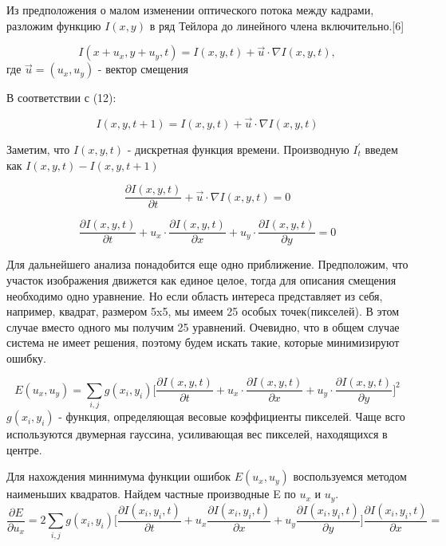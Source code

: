 \documentclass[a4paper,14pt]{extarticle}
\begin{document}
Из предположения о малом изменении оптического потока между кадрами, разложим функцию $I(x,y)$ в ряд Тейлора до линейного члена включительно.[6]

\begin{equation}
    I(x+u_x,y+u_y,t) = I(x,y,t) + \vec u \cdot \nabla I(x,y,t),
\end{equation}
где $\vec{u} = (u_x, u_y)$ - вектор смещения

В соответствии с (12):

\begin{equation}
    I(x,y,t+1) = I(x,y,t) + \vec u \cdot \nabla I(x,y,t)  
\end{equation}

Заметим, что $I(x,y,t)$ - дискретная функция времени. Производную $I^'_t$ введем как $I(x,y,t)-I(x,y,t+1)$

\begin{equation}
    \frac{\partial I(x,y,t)}{\partial t} + \vec u \cdot \nabla I(x,y,t) = 0
\end{equation}

\begin{equation}
    \frac{\partial I(x,y,t)}{\partial t} + u_x \cdot \frac{\partial I(x,y,t)}{\partial x} + u_y \cdot \frac{\partial I(x,y,t)}{\partial y} = 0
\end{equation}

Для дальнейшего анализа понадобится еще одно приближение. Предположим, что участок изображения движется как единое целое, тогда для описания смещения необходимо одно уравнение. Но если область интереса представляет из себя, например, квадрат, размером 5x5, мы имеем 25 особых точек(пикселей). В этом случае вместо одного мы получим 25 уравнений. Очевидно, что в общем случае система не имеет решения, поэтому будем искать такие, которые минимизируют ошибку.

\begin{equation}
    E(u_x,u_y) = \sum_{i,j} g(x_i,y_i)\Big[\frac{\partial I(x,y,t)}{\partial t} + u_x \cdot \frac{\partial I(x,y,t)}{\partial x} + u_y \cdot \frac{\partial I(x,y,t)}{\partial y}\Big]^2
\end{equation}
$g(x_i,y_i)$ - функция, определяющая весовые коэффициенты пикселей. Чаще всго используются двумерная гауссина, усиливающая вес пикселей, находящихся в центре. 

Для нахождения миннимума функции ошибок $E(u_x,u_y)$ воспользуемся методом наименьших квадратов. Найдем частные производные E по $u_x$ и $u_y$.
\begin{equation}
    \frac{\partial E}{\partial u_x} = 2\sum_{i,j} g(x_i,y_i)\Big[\frac{\partial I(x_i,y_i,t)}{\partial t} + u_x \frac{\partial I(x_i,y_i,t)}{\partial x} + u_y \frac{\partial I(x_i,y_i,t)}{\partial y}\Big] \frac{\partial I(x_i,y_i,t)}{\partial x}= 
\end{equation}
\end{document}
